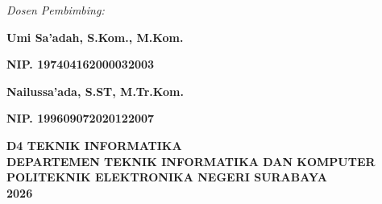 \begin{titlepage}
\begin{center}
    {\fontsize{12pt}{14pt}\selectfont\textit{Dosen Pembimbing:}\par}
    \vspace{0.4cm}
    {\fontsize{14pt}{16pt}\selectfont\textbf{Umi Sa'adah, S.Kom., M.Kom.}\par}
    \vspace{0.1cm}
    {\fontsize{14pt}{16pt}\selectfont\textbf{NIP. 197404162000032003}\par}
    \vspace{0.5cm}
    {\fontsize{14pt}{16pt}\selectfont\textbf{Nailussa'ada, S.ST, M.Tr.Kom.}\par}
    \vspace{0.1cm}
    {\fontsize{14pt}{16pt}\selectfont\textbf{NIP. 199609072020122007}\par}
    
    \vfill
    
    {\fontsize{14pt}{16pt}\selectfont
    \textbf{D4 TEKNIK INFORMATIKA}\\
    \textbf{DEPARTEMEN TEKNIK INFORMATIKA DAN KOMPUTER}\\
    \textbf{POLITEKNIK ELEKTRONIKA NEGERI SURABAYA}\\
    \textbf{2026}\par}
    
\end{center}
\end{titlepage}
